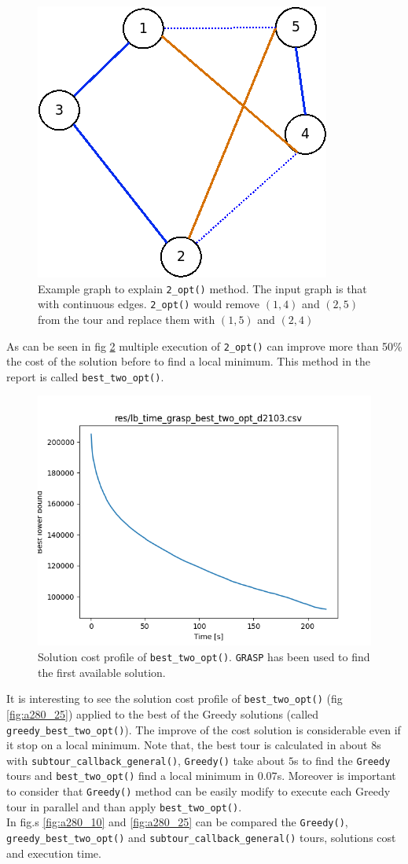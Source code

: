 \begin{figure}[h]
	\centering
	\includegraphics[width=.3\columnwidth]{img/2_opt_graph.png}
	\caption{Example graph to explain \texttt{2\_opt()} method. The input graph is that with continuous edges. \texttt{2\_opt()} would remove $ (1,4) $ and $ (2,5) $ from the tour and replace them with $ (1,5) $ and $  (2,4) $}
	\label{fig:2_opt_graph}
\end{figure}
As can be seen in fig \ref{fig:lb_time_grasp_best_two_opt_d2103} multiple execution of \texttt{2\_opt()} can improve more than 50\% the cost of the solution before to find a local minimum. This method in the report is called \texttt{best\_two\_opt()}.
\begin{figure}[!h]
\centering
\includegraphics[width=.6\columnwidth]{../res/lb_time_grasp_best_two_opt_d2103.png}
\caption{Solution cost profile of \texttt{best\_two\_opt()}. \texttt{GRASP} has been used to find the first available solution.}
\label{fig:lb_time_grasp_best_two_opt_d2103}
\end{figure}

It is interesting to see the solution cost profile of \texttt{best\_two\_opt()} (fig \ref{fig:a280_25}) applied to the best of the Greedy solutions (called \texttt{greedy\_best\_two\_opt()}). The improve of the cost solution is considerable even if it stop on a local minimum.  Note that, the best tour is calculated in about $ 8 $s with \texttt{subtour\_callback\_general()}, \texttt{Greedy()} take about $ 5 $s to find the \texttt{Greedy} tours and \texttt{best\_two\_opt()} find a local minimum in $0.07$s. Moreover is important to consider that \texttt{Greedy()} method can be easily modify to execute each Greedy tour in parallel and than apply \texttt{best\_two\_opt()}.\\
In fig.s \ref{fig:a280_10} and \ref{fig:a280_25} can be compared the \texttt{Greedy()}, \texttt{greedy\_best\_two\_opt()} and \texttt{subtour\_callback\_general()} tours, solutions cost and execution time.\\

